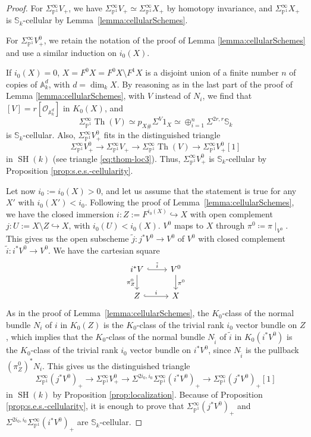 \documentclass[10pt]{amsart}
\theoremstyle{definition}
\theoremstyle{plain}
\numberwithin{equation}{section}
\newcommand{\0}{\emptyset}
\newcommand{\sO}{{\mathcal O}}
\newcommand{\A}{{\mathbb A}}
\renewcommand{\P}{{\mathbb P}}
\newcommand{\SH}{{\operatorname{SH}}}
\newcommand{\Th}{{\operatorname{Th}}}
\renewcommand{\dim}{{\operatorname{dim}}}
\begin{document}
\begin{proof} For $\Sigma^\infty_{\P^1}V_+$, we have $\Sigma^\infty_{\P^1}V_+\simeq \Sigma^\infty_{\P^1}X_+$ by homotopy invariance, and $\Sigma^\infty_{\P^1}X_+$ is $\mathbb{S}_k$-cellular by Lemma~\ref{lemma:cellularSchemes}.

For $\Sigma^\infty_{\P^1}V^0_+$, we retain the notation of the proof of Lemma \ref{lemma:cellularSchemes} and use a similar induction on $i_0(X)$.

If $i_0(X)=0$, $X=F^0X=F^0X \setminus F^1X$ is a disjoint union of a finite number $n$ of copies of $\A^d_k$, with $d=\dim_kX$. By reasoning as in the last part of the proof of Lemma \ref{lemma:cellularSchemes}, with $V$ instead of $N_i$, we find that $[V]=r[\sO_{\A_k^d}]$ in $K_0(X)$, and 
$$\Sigma_{\P^1}^\infty\Th(V)\simeq p_{X\#}\Sigma^V1_X \simeq \oplus_{i=1}^n\Sigma^{2r,r}\mathbb{S}_k$$
is $\mathbb{S}_k$-cellular. Also, $\Sigma_{\P^1}^\infty V_+^0$ fits in the distinguished triangle
$$\Sigma_{\P^1}^\infty V_+^0 \to \Sigma_{\P^1}^\infty V_+ \to \Sigma^\infty_{\P^1}\Th(V) \to \Sigma_{\P^1}^\infty V_+^0[1]$$
in $\SH(k)$ (see triangle \eqref{eq:thom-loc3}). Thus, $\Sigma_{\P^1}^\infty V_+^0$ is $\mathbb{S}_k$-cellular by Proposition \eqref{prop:s.e.s.-cellularity}.

Let now $i_0:=i_0(X)>0$, and let us assume that the statement is true for any $X'$ with $i_0(X')<i_0$. Following the proof of Lemma~\ref{lemma:cellularSchemes}, we have the closed immersion $i:Z:=F^{i_0(X)}\hookrightarrow X$ with open complement $j:U:=X\setminus Z\hookrightarrow X$, with $i_0(U)<i_0(X)$. $V^0$ maps to $X$ through $\pi^0\coloneqq \pi\mid_{V^0}$. This gives us the open subscheme $\tilde{j}:j^*V^0\to V^0$ of $V^0$ with closed complement $\tilde{i}:i^*V^0\to V^0$. We have the cartesian square
$$
\begin{tikzcd}
    i^*V \arrow[r, hook, "\tilde{i}"] \arrow[d, swap, "\pi^0_Z"] & V^0 \arrow[d, "\pi^0"] \\
    Z \arrow[r, hook, "i"] & X
\end{tikzcd}
$$
As in the proof of Lemma~\ref{lemma:cellularSchemes}, the $K_0$-class of the normal bundle $N_i$ of $i$ in $K_0(Z)$ is the $K_0$-class of the trivial rank $i_0$ vector bundle on $Z$, which implies that the $K_0$-class of the normal bundle $N_{\tilde{i}}$ of $\tilde{i}$ in $K_0(i^*V^0)$ is the $K_0$-class of the trivial rank $i_0$ vector bundle on $i^*V^0$, since $N_{\tilde{i}}$ is the pullback $(\pi^0_Z)^*N_i$. This gives us the distinguished triangle
\[
\Sigma^\infty_{\P^1}(j^*V^0)_+\to \Sigma^\infty_{\P^1}V^0_+\to \Sigma^{2i_0, i_0}\Sigma^\infty_{\P^1}(i^*V^0)_+\to  \Sigma^\infty_{\P^1}(j^*V^0)_+[1]
\]
 in $\SH(k)$ by Proposition \ref{prop:localization}. Because of Proposition \ref{prop:s.e.s.-cellularity}, it is enough to prove that $\Sigma^\infty_{\P^1}(j^*V^0)_+$ and $\Sigma^{2i_0, i_0}\Sigma^\infty_{\P^1}(i^*V^0)_+$ are $\mathbb{S}_k$-cellular. 


\end{proof}
\end{document}
